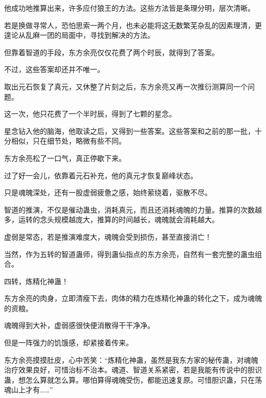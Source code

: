 \begin{this_body}
他成功地推算出来，许多应付狼王的方法。这些方法皆是条理分明，层次清晰。

若是换做寻常人，恐怕思索一两个月，也未必能将这无数繁芜杂乱的因素理清，更遑论从乱麻一团的局面中，寻找到解决的方法。

但靠着智道的手段，东方余亮仅仅花费了两个时辰，就得到了答案。

不过，这些答案却还并不唯一。

取出元石恢复了真元，又休整了片刻之后，东方余亮又再一次推衍测算同一个问题。

这一次，他只花费了一个半时辰，得到了七颗的星念。

星念钻入他的脑海，他取读之后，又得到一些答案。这些答案和之前的那一批，十分相似，只在细节处，略微有些不同。

东方余亮松了一口气，真正停歇下来。

过了好一会儿，依靠着元石补充，他的真元才恢复巅峰状态。

只是魂魄深处，还有一股虚弱疲惫之感，始终萦绕着，驱散不尽。

智道的推演，不仅是催动蛊虫，消耗真元，而且还消耗魂魄的力量。推算的次数越多，运转的念头规模越庞大，推算的时间越长，魂魄就会消耗越大。

虚弱是常态，若是推演难度大，魂魄会受到损伤，甚至直接消亡！

当然，作为五转的智道蛊师，得到蛊仙指点的东方余亮，自然有一套完整的蛊虫组合。

四转，炼精化神蛊！

东方余亮的肉身，立即清瘦下去，肉体的精力在炼精化神蛊的转化之下，成为魂魄的资粮。

魂魄得到大补，虚弱感很快便消散得干干净净。

但是一阵强力的饥饿感，却紧接着传来。

东方余亮摸摸肚皮，心中苦笑：“炼精化神蛊，虽然是我东方家的秘传蛊，对魂魄治疗效果良好，可惜治标不治本。魂道、智道关系紧密，若是我能有传说中的胆识蛊，想怎么算就怎么算。哪怕算得魂魄受伤，都能迅速复原。可惜胆识蛊，只在荡魂山上才有……”

\end{this_body}


